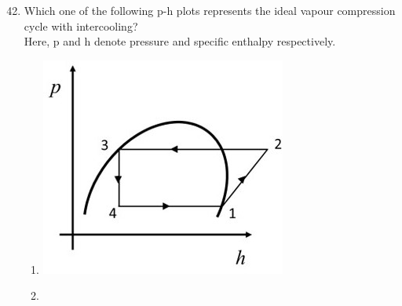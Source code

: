 \documentclass[journal]{IEEEtran}
\theoremstyle{remark}
\begin{document}
\newpage
\vspace*{0.25cm}

\begin{enumerate}[itemsep=1em]
\setcounter{enumi}{41}
\item Which one of the following p-h plots represents the ideal vapour compression cycle with intercooling?\\  
Here, p and h denote pressure and specific enthalpy respectively. 
\begin{multicols}{4}
\begin{enumerate}
    \item \begin{minipage}[t]{0.2\textwidth}
    \vspace{0pt}
        \includegraphics[width=\columnwidth]{figs/fig-11.jpeg}
        \label{fig-11}
    \end{minipage}
    \item \begin{minipage}[t]{0.2\textwidth}
    \vspace{0pt}

\end{minipage}
\end{enumerate}
\end{multicols}
\end{enumerate}
\end{document}
